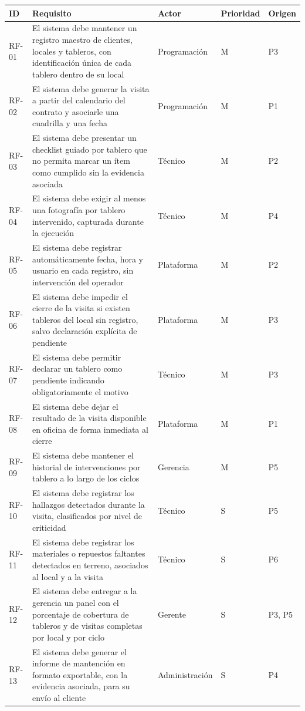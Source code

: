 \documentclass[10pt,letterpaper]{article}
\begin{document}
\begin{longtable}{@{}p{1.4cm}p{8.4cm}p{1.8cm}p{1.6cm}p{1.4cm}@{}}
\toprule
\textbf{ID} & \textbf{Requisito} & \textbf{Actor} & \textbf{Prioridad} & \textbf{Origen} \\
\midrule
\endhead
RF-01 & El sistema debe mantener un registro maestro de clientes, locales y tableros, con identificación única de cada tablero dentro de su local & Programación & M & P3 \\
RF-02 & El sistema debe generar la visita a partir del calendario del contrato y asociarle una cuadrilla y una fecha & Programación & M & P1 \\
RF-03 & El sistema debe presentar un checklist guiado por tablero que no permita marcar un ítem como cumplido sin la evidencia asociada & Técnico & M & P2 \\
RF-04 & El sistema debe exigir al menos una fotografía por tablero intervenido, capturada durante la ejecución & Técnico & M & P4 \\
RF-05 & El sistema debe registrar automáticamente fecha, hora y usuario en cada registro, sin intervención del operador & Plataforma & M & P2 \\
RF-06 & El sistema debe impedir el cierre de la visita si existen tableros del local sin registro, salvo declaración explícita de pendiente & Plataforma & M & P3 \\
RF-07 & El sistema debe permitir declarar un tablero como pendiente indicando obligatoriamente el motivo & Técnico & M & P3 \\
RF-08 & El sistema debe dejar el resultado de la visita disponible en oficina de forma inmediata al cierre & Plataforma & M & P1 \\
RF-09 & El sistema debe mantener el historial de intervenciones por tablero a lo largo de los ciclos & Gerencia & M & P5 \\
RF-10 & El sistema debe registrar los hallazgos detectados durante la visita, clasificados por nivel de criticidad & Técnico & S & P5 \\
RF-11 & El sistema debe registrar los materiales o repuestos faltantes detectados en terreno, asociados al local y a la visita & Técnico & S & P6 \\
RF-12 & El sistema debe entregar a la gerencia un panel con el porcentaje de cobertura de tableros y de visitas completas por local y por ciclo & Gerente & S & P3, P5 \\
RF-13 & El sistema debe generar el informe de mantención en formato exportable, con la evidencia asociada, para su envío al cliente & Administración & S & P4 \\

\end{longtable}
\end{document}
